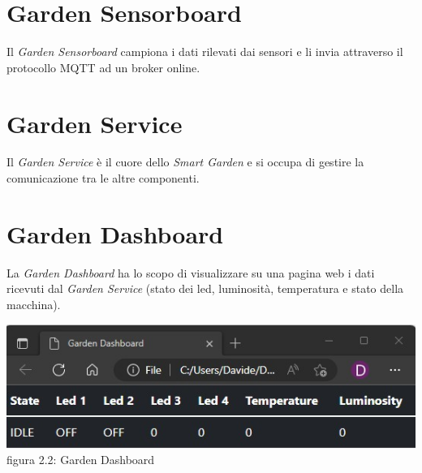 \documentclass[a4paper,12pt]{report}
\begin{document}
\section{Garden Sensorboard}
Il \textit{Garden Sensorboard} campiona i dati rilevati dai sensori e li invia attraverso il protocollo MQTT ad un broker online.

\section{Garden Service}
Il \textit{Garden Service} è il cuore dello \textit{Smart Garden} e si occupa di gestire la comunicazione tra le altre componenti.

\section{Garden Dashboard}
La \textit{Garden Dashboard} ha lo scopo di visualizzare su una pagina web i dati ricevuti dal \textit{Garden Service} (stato dei led, luminosità, temperatura e stato della macchina).
\begin{center}
	\includegraphics[scale = 0.7]{dashboard}
	\\figura 2.2: Garden Dashboard
\end{center}
\end{document}
